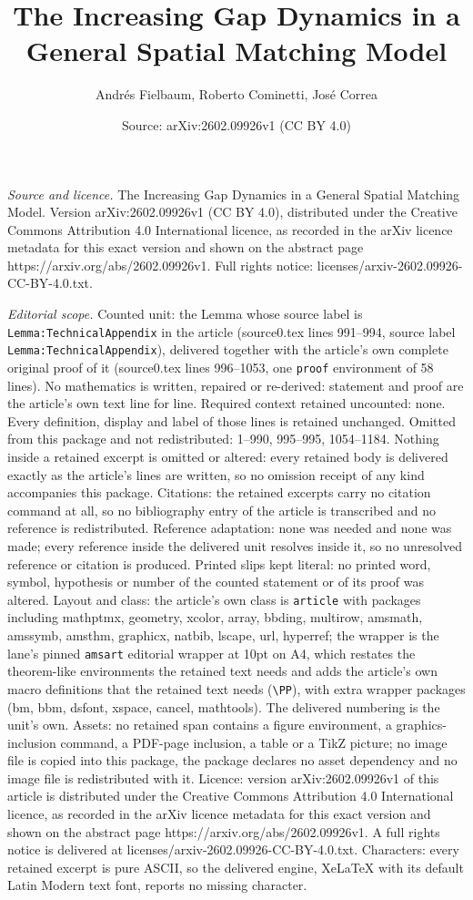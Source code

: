 \documentclass[10pt,a4paper]{amsart}
\title[The Increasing Gap Dynamics in a General Spatial Matching Mo]{The Increasing Gap Dynamics in a General Spatial Matching Model}
\author{Andr\'es Fielbaum, Roberto Cominetti, Jos\'e Correa}
\date{Source: arXiv:2602.09926v1 (CC BY 4.0)}
\begin{document}
\maketitle

\noindent\emph{Source and licence.} The Increasing Gap Dynamics in a General Spatial Matching Model. Version arXiv:2602.09926v1 (CC BY 4.0), distributed under the Creative Commons Attribution 4.0 International licence, as recorded in the arXiv licence metadata for this exact version and shown on the abstract page https://arxiv.org/abs/2602.09926v1. Full rights notice: licenses/arxiv-2602.09926-CC-BY-4.0.txt.\par\smallskip

\noindent\textit{Editorial scope.} Counted unit: the Lemma whose source label is \texttt{Lemma:TechnicalAppendix} in the article (source0.tex lines 991--994, source label \texttt{Lemma:TechnicalAppendix}), delivered together with the article's own complete original proof of it (source0.tex lines 996--1053, one \texttt{proof} environment of 58 lines). No mathematics is written, repaired or re-derived: statement and proof are the article's own text line for line. Required context retained uncounted: none. Every definition, display and label of those lines is retained unchanged. Omitted from this package and not redistributed: 1--990, 995--995, 1054--1184. Nothing inside a retained excerpt is omitted or altered: every retained body is delivered exactly as the article's lines are written, so no omission receipt of any kind accompanies this package. Citations: the retained excerpts carry no citation command at all, so no bibliography entry of the article is transcribed and no reference is redistributed. Reference adaptation: none was needed and none was made; every reference inside the delivered unit resolves inside it, so no unresolved reference or citation is produced. Printed slips kept literal: no printed word, symbol, hypothesis or number of the counted statement or of its proof was altered. Layout and class: the article's own class is \texttt{article} with packages including mathptmx, geometry, xcolor, array, bbding, multirow, amsmath, amssymb, amsthm, graphicx, natbib, lscape, url, hyperref; the wrapper is the lane's pinned \texttt{amsart} editorial wrapper at 10pt on A4, which restates the theorem-like environments the retained text needs and adds the article's own macro definitions that the retained text needs (\texttt{\textbackslash PP}), with extra wrapper packages (bm, bbm, dsfont, xspace, cancel, mathtools). The delivered numbering is the unit's own. Assets: no retained span contains a figure environment, a graphics-inclusion command, a PDF-page inclusion, a table or a TikZ picture; no image file is copied into this package, the package declares no asset dependency and no image file is redistributed with it. Licence: version arXiv:2602.09926v1 of this article is distributed under the Creative Commons Attribution 4.0 International licence, as recorded in the arXiv licence metadata for this exact version and shown on the abstract page https://arxiv.org/abs/2602.09926v1. A full rights notice is delivered at licenses/arxiv-2602.09926-CC-BY-4.0.txt. Characters: every retained excerpt is pure ASCII, so the delivered engine, XeLaTeX with its default Latin Modern text font, reports no missing character.
\end{document}
